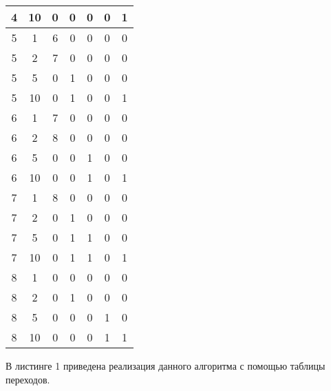 \begin{longtable}[c]{|c|c|c|c|c|c|c|}
4     & 10     & 0         & 0        & 0        & 0          & 1        \\ \hline
5     & 1      & 6         & 0        & 0        & 0          & 0        \\ \hline
5     & 2      & 7         & 0        & 0        & 0          & 0        \\ \hline
5     & 5      & 0         & 1        & 0        & 0          & 0        \\ \hline
5     & 10     & 0         & 1        & 0        & 0          & 1        \\ \hline
6     & 1      & 7         & 0        & 0        & 0          & 0        \\ \hline
6     & 2      & 8         & 0        & 0        & 0          & 0        \\ \hline
6     & 5      & 0         & 0        & 1        & 0          & 0        \\ \hline
6     & 10     & 0         & 0        & 1        & 0          & 1        \\ \hline
7     & 1      & 8         & 0        & 0        & 0          & 0        \\ \hline
7     & 2      & 0         & 1        & 0        & 0          & 0        \\ \hline
7     & 5      & 0         & 1        & 1        & 0          & 0        \\ \hline
7     & 10     & 0         & 1        & 1        & 0          & 1        \\ \hline
8     & 1      & 0         & 0        & 0        & 0          & 0        \\ \hline
8     & 2      & 0         & 1        & 0        & 0          & 0        \\ \hline
8     & 5      & 0         & 0        & 0        & 1          & 0        \\ \hline
8     & 10     & 0         & 0        & 0        & 1          & 1        \\ \hline
\end{longtable}
\endgroup
\FloatBarrier

В листинге 1 приведена реализация данного алгоритма с помощью таблицы переходов.

